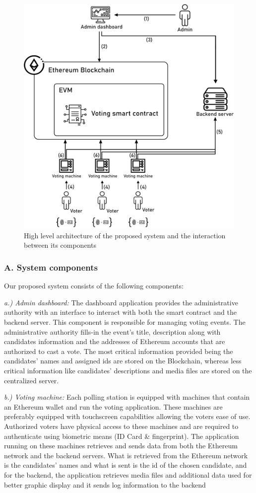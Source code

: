 \begin{figure}[H]
	\centering
		\includegraphics[width=12cm]{images/chapter3/architecture.png}
		\caption{{\footnotesize High level architecture of the proposed system and the interaction between its components}}
\end{figure}

\subsubsection{A. System components}

Our proposed system consists of the following components:

\textit{a.) Admin dashboard:} The dashboard application provides the administrative authority with an interface to interact with both the smart contract and the backend server. This component is responsible for managing voting events. The administrative authority fills-in the event's title, description along with candidates information and the addresses of Ethereum accounts that are authorized to cast a vote. The most critical information provided being the candidates' names and assigned ids are stored on the Blockchain, whereas less critical information like candidates' descriptions and media files are stored on the centralized server.

\textit{b.) Voting machine:} Each polling station is equipped with machines that contain an Ethereum wallet and run the voting application. These machines are preferably equipped with touchscreen capabilities allowing the voters ease of use. Authorized voters have physical access to these machines and are required to authenticate using biometric means (ID Card \& fingerprint). The application running on these machines retrieves and sends data from both the Ethereum network and the backend servers. What is retrieved from the Ethereum network is the candidates' names and what is sent is the id of the chosen candidate, and for the backend, the application retrieves media files and additional data used for better graphic display and it sends log information to the backend

